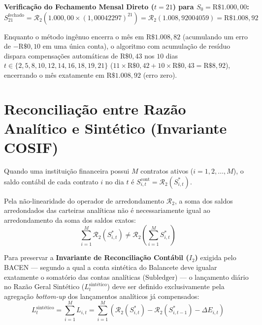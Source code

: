 \documentclass[11pt, a4paper]{article}
\begin{document}
\noindent \textbf{Verificação do Fechamento Mensal Direto ($t = 21$) para $S_0 = \text{R\$ } 1.000{,}00$:}
\begin{equation}
    S_{21}^{\text{fechado}} = \mathcal{R}_2 \left( 1.000{,}00 \times (1{,}00042297)^{21} \right) = \mathcal{R}_2 \left( 1.008{,}92004059 \right) = \text{R\$ } 1.008{,}92
\end{equation}

Enquanto o método ingênuo encerra o mês em $\text{R\$ } 1.008{,}82$ (acumulando um erro de $-\text{R\$ } 0{,}10$ em uma única conta), o algoritmo com acumulação de resíduo dispara compensações automáticas de $\text{R\$ } 0{,}43$ nos $10$ dias $t \in \{2, 5, 8, 10, 12, 14, 16, 18, 19, 21\}$ ($11 \times \text{R\$ } 0{,}42 + 10 \times \text{R\$ } 0{,}43 = \text{R\$ } 8{,}92$), encerrando o mês exatamente em $\text{R\$ } 1.008{,}92$ (erro zero).

\section{Reconciliação entre Razão Analítico e Sintético (Invariante COSIF)}

Quando uma instituição financeira possui $M$ contratos ativos ($i = 1, 2, \dots, M$), o saldo contábil de cada contrato $i$ no dia $t$ é $S_{i,t}^{\text{cont}} = \mathcal{R}_2(S_{i,t}^{*})$.

Pela não-linearidade do operador de arredondamento $\mathcal{R}_2$, a soma dos saldos arredondados das carteiras analíticas não é necessariamente igual ao arredondamento da soma dos saldos exatos:
\begin{equation}
    \sum_{i=1}^{M} \mathcal{R}_2(S_{i,t}^{*}) \neq \mathcal{R}_2 \left( \sum_{i=1}^{M} S_{i,t}^{*} \right)
\end{equation}

Para preservar a \textbf{Invariante de Reconciliação Contábil ($I_2$)} exigida pelo BACEN — segundo a qual a conta sintética do Balancete deve igualar exatamente o somatório das contas analíticas ($\text{Subledger}$) — o lançamento diário no Razão Geral Sintético ($L_{t}^{\text{sintético}}$) deve ser definido exclusivamente pela agregação \textit{bottom-up} dos lançamentos analíticos já compensados:
\begin{equation}
    L_{t}^{\text{sintético}} = \sum_{i=1}^{M} L_{i,t} = \sum_{i=1}^{M} \left( \mathcal{R}_2(S_{i,t}^{*}) - \mathcal{R}_2(S_{i,t-1}^{*}) - \Delta E_{i,t} \right)
\end{equation}
\end{document}
